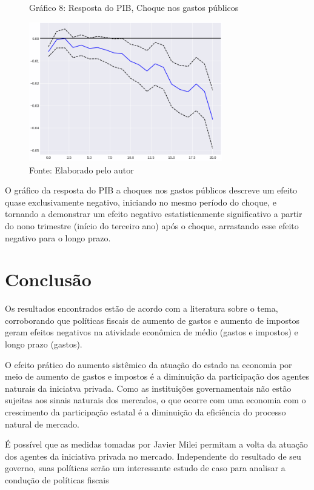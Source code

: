\documentclass[a4paper, 12pt, openany, oneside, brazil]{abntex2}
\begin{document}
\begin{figure}[h!]
	\caption*{Gráfico 8: Resposta do PIB, Choque nos gastos públicos}
	\includegraphics[width=0.75\textwidth]{resultados/irf_expenditure_gdp}
	\caption*{Fonte: Elaborado pelo autor}
\end{figure}

O gráfico da resposta do PIB a choques nos gastos públicos descreve um efeito quase exclusivamente negativo, iniciando no mesmo período do choque, e tornando a demonstrar um efeito negativo estatisticamente significativo a partir do nono trimestre (início do terceiro ano) após o choque, arrastando esse efeito negativo para o longo prazo.



\chapter{Conclusão}
Os resultados encontrados estão de acordo com a literatura sobre o tema, corroborando que políticas fiscais de aumento de gastos e aumento de impostos geram efeitos negativos na atividade econômica de médio (gastos e impostos) e longo prazo (gastos). 

O efeito prático do aumento sistêmico da atuação do estado na economia por meio de aumento de gastos e impostos é a diminuição da participação dos agentes naturais da iniciatva privada. Como as instituições governamentais não estão sujeitas aos sinais naturais dos mercados, o que ocorre com uma economia com o crescimento da participação estatal é a diminuição da eficiência do processo natural de mercado.

É possível que as medidas tomadas por Javier Milei permitam a volta da atuação dos agentes da iniciativa privada no mercado. Independente do resultado de seu governo, suas políticas serão um interessante estudo de caso para analisar a condução de políticas fiscais
\end{document}
